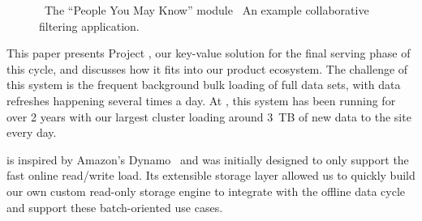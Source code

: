 \begin{figure}
\centering
{}


\caption{~The ``People You May Know'' module
~An example collaborative filtering
application.}
\end{figure}

This paper presents Project \projectname{}, our key-value solution for
the final serving phase of this cycle, and discusses how it fits into
our product ecosystem. The challenge of this system is the frequent
background bulk loading of full data sets, with data refreshes
happening several times a day. At \linkedin, this system has been
running for over 2 years with our largest cluster loading around 3~TB
of new data to the site every day. 

\projectname{} is inspired by Amazon's Dynamo~\cite{dynamo} and was
initially designed to only support the fast online read/write load.
Its extensible storage layer allowed us to quickly build our own
custom read-only storage engine to integrate with the offline data
cycle and support these batch-oriented use cases.

